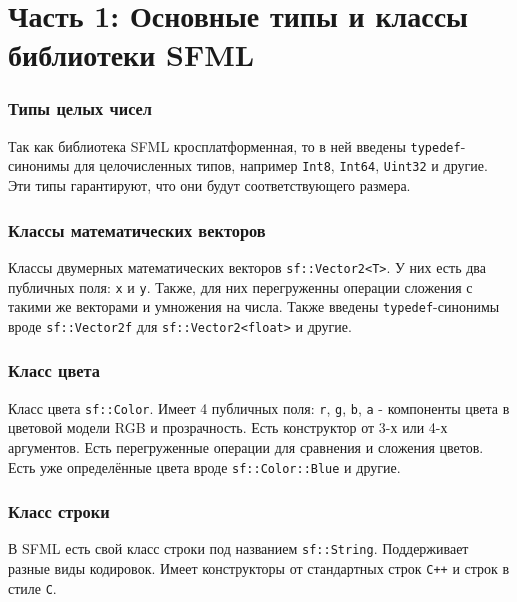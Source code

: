 \documentclass{article}
\begin{document}
\newpage



\section*{Часть 1: Основные типы и классы библиотеки SFML}
\subsubsection*{Типы целых чисел}
Так как библиотека SFML кросплатформенная, то в ней введены \texttt{typedef}-синонимы для целочисленных типов, например \texttt{Int8}, \texttt{Int64}, \texttt{Uint32} и другие. Эти типы гарантируют, что они будут соответствующего размера.

\subsubsection*{Классы математических векторов}
Классы двумерных математических векторов \texttt{sf::Vector2<T>}. У них есть два публичных поля: \texttt{x} и \texttt{y}. Также, для них перегруженны операции сложения с такими же векторами и умножения на числа. Также введены \texttt{typedef}-синонимы вроде \texttt{sf::Vector2f} для \texttt{sf::Vector2<float>} и другие.

\subsubsection*{Класс цвета}
Класс цвета \texttt{sf::Color}. Имеет 4 публичных поля: \texttt{r}, \texttt{g}, \texttt{b}, \texttt{a} - компоненты цвета в цветовой модели RGB и прозрачность. Есть конструктор от 3-х или 4-х аргументов. Есть перегруженные операции для сравнения и сложения цветов. Есть уже определённые цвета вроде \texttt{sf::Color::Blue} и другие.

\subsubsection*{Класс строки}
В SFML есть свой класс строки под названием \texttt{sf::String}. Поддерживает разные виды кодировок. Имеет конструкторы от стандартных строк \texttt{C++} и строк в стиле \texttt{C}.
\end{document}

